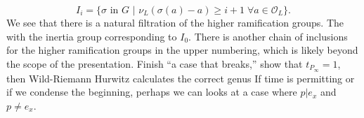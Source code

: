 \documentclass{article}
\begin{document}
\begin{outline}[enumerate]
               $$
               I_i = \{\sigma \text{ in } G \text{ | }\nu_L(\sigma(a) - a) \geq i + 1 \; \forall a \in \mathcal{O}_L \}.
               $$
            \2 We see that there is a natural filtration of the higher ramification groups. The with the inertia group corresponding to $I_0$. There is another chain  of inclusions for the higher ramification groups in the upper numbering, which is likely beyond the scope of the presentation.
   \1 Finish ``a case that breaks,'' show that $t_{P_{\infty}} = 1$, then Wild-Riemann Hurwitz calculates the correct genus
   \1 If time is permitting or if we condense the beginning, perhaps we can looks at a case where $p| e_x$ and $p \not = e_x$.
\end{outline}
\end{document}
